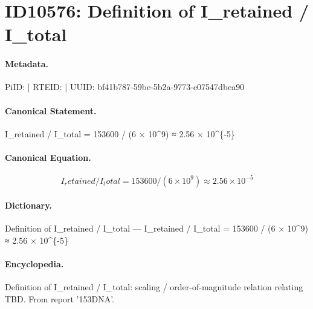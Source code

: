 \section*{ID10576: Definition of I\_retained / I\_total}
\paragraph{Metadata.}
PiID:  | RTEID:  | UUID: bf41b787-59be-5b2a-9773-e07547dbea90

\paragraph{Canonical Statement.}
I\_retained / I\_total = 153600 / (6 × 10\textasciicircum{}9) ≈ 2.56 × 10\textasciicircum{}\{-5\}

\paragraph{Canonical Equation.}
\[
I_retained / I_total = 153600 / (6 × 10^9) ≈ 2.56 × 10^{-5}
\]

\paragraph{Dictionary.}
Definition of I\_retained / I\_total — I\_retained / I\_total = 153600 / (6 × 10\textasciicircum{}9) ≈ 2.56 × 10\textasciicircum{}\{-5\}

\paragraph{Encyclopedia.}
Definition of I\_retained / I\_total: scaling / order-of-magnitude relation relating TBD. From report '153DNA'.
